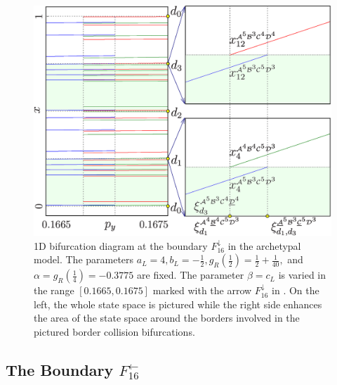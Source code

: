\begin{figure}[H]
	\centering
	\includegraphics[width=.7 \textwidth]{../Figures/6/6.5/result.png}
	\caption[1D bifurcation diagram at the boundary $F_{16}^\downarrow$ in the archetypal model]{
		1D bifurcation diagram at the boundary $F_{16}^\downarrow$ in the archetypal model.
		The parameters $a_L = 4, b_L = -\frac{1}{2}, g_R\left(\frac{1}{2}\right) = \frac{1}{2} + \frac{1}{40},$ and $\alpha = g_R\left(\frac{1}{4}\right) = -0.3775$ are fixed.
		The parameter $\beta = c_L$ is varied in the range $[0.1665, 0.1675]$ marked with the arrow $F_{16}^\downarrow$ in .
		On the left, the whole state space is pictured while the right side enhances the area of the state space around the borders involved in the pictured border collision bifurcations.
	}
	\label{fig:arch.bif.F.down}
\end{figure}

\subsection{The Boundary $F_{16}^\leftarrow$}
\label{sec:arch.bif.L}

